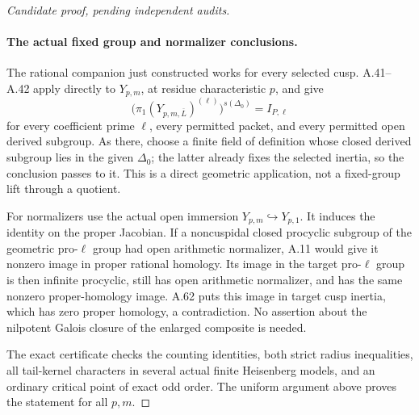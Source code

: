 \begin{proof}[Candidate proof, pending independent audits]
\paragraph{The actual fixed group and normalizer conclusions.}
The rational companion just constructed works for every
selected cusp. A.41--A.42 apply directly to \(Y_{p,m}\),
at residue characteristic \(p\), and give
\[
 \bigl(\pi_1(Y_{p,m,\overline L})^{(\ell)}\bigr)^{s(\Delta_0)}
                        =I_{P,\ell}                    \tag{A.63.14}
\]
for every coefficient prime \(\ell\), every permitted
packet, and every permitted open derived subgroup.
As there, choose a finite field of definition whose
closed derived subgroup lies in the given \(\Delta_0\);
the latter already fixes the selected inertia, so the
conclusion passes to it. This is a direct geometric
application, not a fixed-group lift through a quotient.

For normalizers use the actual open immersion
\(Y_{p,m}\hookrightarrow Y_{p,1}\). It induces the
identity on the proper Jacobian. If a noncuspidal closed
procyclic subgroup of the geometric pro-\(\ell\) group
had open arithmetic normalizer, A.11 would give it
nonzero image in proper rational homology. Its image in
the target pro-\(\ell\) group is then infinite
procyclic, still has open arithmetic normalizer, and has
the same nonzero proper-homology image. A.62 puts this
image in target cusp inertia, which has zero proper
homology, a contradiction. No assertion about the
nilpotent Galois closure of the enlarged composite is
needed.

The exact certificate 
checks the counting identities, both strict radius
inequalities, all tail-kernel characters in several
actual finite Heisenberg models, and an ordinary
critical point of exact odd order. The uniform argument
above proves the statement for all \(p,m\).
\end{proof}
